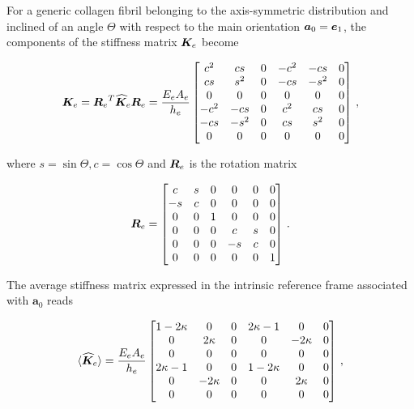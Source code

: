 \documentclass[preprint,12pt]{elsarticle}
\newcommand{\mbs}[1]{\boldsymbol{#1}}
\def\ba{{\mbs{a}}} \def\bb{{\mbs{b}}} \def\bc{{\mbs{c}}}
\begin{document}
For a generic collagen fibril belonging to the axis-symmetric distribution and inclined of an angle $\Theta$ with respect to the main orientation $\ba_0=\be_1$, the components of the stiffness matrix $\bK_e$ become
\begin{linenomath}
\begin{equation}
	\bK_e  
    = 
    {\bR_e}^T \widehat{\bK}_e \bR_e
    =
    \dfrac{E_e A_e}{h_e}
	   \begin{bmatrix}
		 c^2 & cs   & 0 & -c^2 & -cs  & 0\\
		  cs & s^2  & 0 &  -cs & -s^2 & 0\\
		   0 &   0  & 0 &    0 &    0 & 0\\
		-c^2 & -cs  & 0 &  c^2 &  cs  & 0\\
		 -cs & -s^2 & 0 &   cs &  s^2 & 0\\
		   0 &    0 & 0 &    0 &    0 & 0
	\end{bmatrix}\label{truss2} \,,
\end{equation}
\end{linenomath}
where $s=\sin \Theta, c=\cos \Theta$ and $\bR_e$ is the rotation matrix
\begin{linenomath}
\begin{equation}\label{eq:rotation}
    \bR_e   
    =
    \begin{bmatrix}
     c & s &  0 &  0 & 0 & 0 \\
    -s & c &  0 &  0 & 0 & 0 \\
     0 & 0 &  1 &  0 & 0 & 0 \\
     0 & 0 &  0 &  c & s & 0 \\
	   0 & 0 &  0 & -s & c & 0 \\
     0 & 0 &  0 &  0 & 0 & 1 
    \end{bmatrix} \,.
\end{equation}
\end{linenomath}
The average stiffness matrix expressed in the intrinsic reference frame associated with $\ba_0$ reads
\begin{linenomath}
\begin{equation}\label{eq:AVGstiff}
	\langle \widehat{\bK}_e \rangle = \dfrac{E_e A_e}{h_e}
	\begin{bmatrix}
		1-2\kappa & 0 & 0 & 2\kappa-1 & 0 & 0 \\
		0 & 2\kappa & 0 & 0 & -2\kappa & 0\\
        0 & 0 & 0 & 0 & 0 & 0\\
		2\kappa-1 & 0 & 0 & 1-2\kappa & 0 & 0 \\
		0 & -2\kappa & 0 & 0 & 2\kappa & 0\\
        0 & 0 & 0 & 0 & 0 & 0
	\end{bmatrix} \,,
\end{equation}
\end{linenomath}
\end{document}
